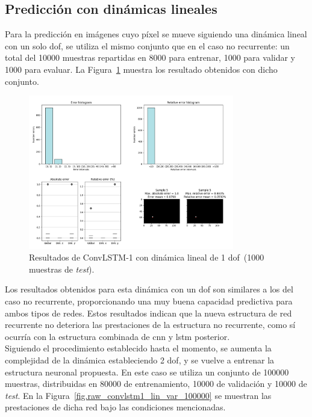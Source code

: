 \subsection{Predicción con dinámicas lineales}
Para la predicción en imágenes cuyo píxel se mueve siguiendo una dinámica lineal con un solo \acrshort{dof}, se utiliza el mismo conjunto que en el caso no recurrente: un total del 10000 muestras repartidas en 8000 para entrenar, 1000 para validar y 1000 para evaluar. La Figura~\ref{fig.raw_convlstm1_lin_fix_10000} muestra los resultado obtenidos con dicho conjunto.

\begin{figure}[H]
		\begin{center}
			\includegraphics[width=0.8\textwidth]{ figures/test_raw/REC/ConvLSTM_simple/linear_fix_10000.png}
			\caption{Resultados de ConvLSTM-1 con dinámica lineal de 1 \acrshort{dof}~(1000 muestras de \textit{test}).}
			\label{fig.raw_convlstm1_lin_fix_10000}
		\end{center}
\end{figure}
\vspace{-10pt}

Los resultados obtenidos para esta dinámica con un \acrshort{dof} son similares a los del caso no recurrente, proporcionando una muy buena capacidad predictiva para ambos tipos de redes. Estos resultados indican que la nueva estructura de red recurrente no deteriora las prestaciones de la estructura no recurrente, como sí ocurría con la estructura combinada de \acrshort{cnn} y \acrshort{lstm} posterior.\\

Siguiendo el procedimiento establecido hasta el momento, se aumenta la complejidad de la dinámica estableciendo 2 \acrshort{dof}, y se vuelve a entrenar la estructura neuronal propuesta. En este caso se utiliza un conjunto de 100000 muestras, distribuidas en 80000 de entrenamiento, 10000 de validación y 10000 de \textit{test}. En la Figura~\ref{fig.raw_convlstm1_lin_var_100000} se muestran las prestaciones de dicha red bajo las condiciones mencionadas.

